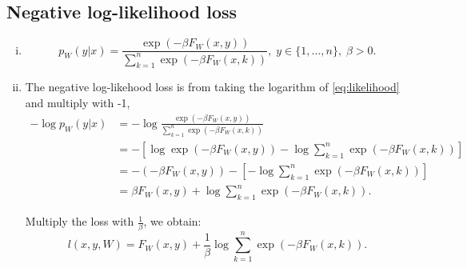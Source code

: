 \documentclass[10pt,a4paper]{article}
\theoremstyle{dotlessP}
\begin{document}
\subsection{Negative log-likelihood loss}
\begin{enumerate}[(i)]
	\item \begin{equation}\label{eq:likelihood}
	p_W(y|x) 
	=\frac{\exp(-\beta F_W(x,y))}{\sum\limits_{k=1}^{n}\exp(-\beta F_W(x,k))}, \; y\in\{1,\ldots,n\}, \; \beta>0.
	\end{equation}
	
	\item The negative log-likehood loss is from taking the logarithm of \eqref{eq:likelihood} and multiply with -1,
	\begin{equation}
	\begin{aligned}
	-\log p_W(y|x) & =- \log \frac{\exp(-\beta F_W(x,y))}{\sum\limits_{k=1}^{n}\exp(-\beta F_W(x,k))} \\
	& = -[\log \exp(-\beta F_W(x,y)) - \log \sum\limits_{k=1}^{n}\exp(-\beta F_W(x,k))]\\
	& = -(-\beta F_W(x,y)) -[- \log \sum\limits_{k=1}^{n}\exp(-\beta F_W(x,k))]\\
	& = \beta F_W(x,y) + \log \sum\limits_{k=1}^{n}\exp(-\beta F_W(x,k)) .
	\end{aligned}
	\end{equation}
	
	Multiply the loss with $\frac{1}{\beta}$, we obtain:
	\begin{equation}\label{eq:loss}
	l(x,y, W) = F_W(x,y) + \frac{1}{\beta}\log \sum\limits_{k=1}^{n}\exp(-\beta F_W(x,k)) .
	\end{equation}
	

\end{enumerate}
\end{document}
